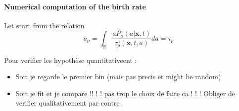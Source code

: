 {\paragraph*{Numerical computation of the birth rate}

Let start from the relation 
\begin{equation}
    a_p 
    =
    \int_{\mathbb{R}} \frac{a P_a(a|\textbf{x},t)}{\tau_p^a(\textbf{x},t,a)}  da
    = \tau_p
\end{equation}

Pour verifier les hypothèse quantitativeent :
\begin{itemize}
    \item Soit je regarde le premier bin (mais pas precis et might be random)
    \item Soit je fit et je compare !! ! ! pas trop le choix de faire ca ! ! ! Obliger de verifier qualitativement par contre
\end{itemize}
}
